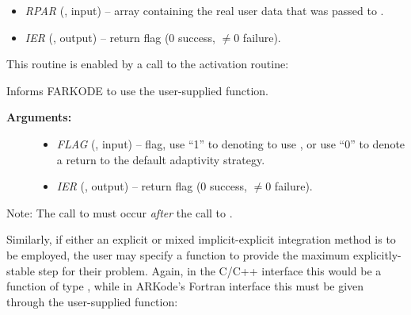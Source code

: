 \documentclass[letterpaper,10pt,english]{sphinxmanual}
\begin{document}
\begin{fulllineitems}
\begin{description}
\begin{itemize}
\item {} 
\emph{RPAR} (, input) -- array containing the real user
data that was passed to {\hyperref[f_interface/Usage:f/_/FARKMALLOC]{\emph{}}}.

\item {} 
\emph{IER} (, output) -- return flag (0 success, \(\ne 0\) failure).

\end{itemize}

\end{description}

\end{fulllineitems}


This routine is enabled by a call to the activation routine:

\begin{fulllineitems}
\label{f_interface/Usage:f/_/FARKADAPTSET}
Informs FARKODE to use the user-supplied {\hyperref[f_interface/Usage:f/_/FARKADAPT]{\emph{}}} function.
\begin{description}
\item[{\textbf{Arguments:}}] \leavevmode\begin{itemize}
\item {} 
\emph{FLAG} (, input) -- flag, use ``1'' to denoting to use
{\hyperref[f_interface/Usage:f/_/FARKADAPT]{\emph{}}}, or use ``0'' to denote a return to the
default adaptivity strategy.

\item {} 
\emph{IER} (, output) -- return flag (0 success, \(\ne
0\) failure).

\end{itemize}

\end{description}

Note: The call to {\hyperref[f_interface/Usage:f/_/FARKADAPTSET]{\emph{}}} must occur \emph{after} the call
to {\hyperref[f_interface/Usage:f/_/FARKMALLOC]{\emph{}}}.

\end{fulllineitems}


Similarly, if either an explicit or mixed implicit-explicit
integration method is to be employed, the user may specify a function
to provide the maximum explicitly-stable step for their problem.
Again, in the C/C++ interface this would be a function of type
{\hyperref[c_interface/User_supplied:c.ARKExpStabFn]{\emph{}}}, while in ARKode's Fortran interface this
must be given through the user-supplied function:
\end{document}
